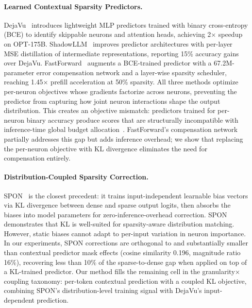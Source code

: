\paragraph{Learned Contextual Sparsity Predictors.}
DejaVu~\cite{liu2023dejavu} introduces lightweight MLP predictors trained with binary cross-entropy (BCE) to identify skippable neurons and attention heads, achieving 2$\times$ speedup on OPT-175B.
ShadowLLM~\cite{akhauri2024shadowllm} improves predictor architectures with per-layer MSE distillation of intermediate representations, reporting 15\% accuracy gains over DejaVu.
FastForward~\cite{gautam2026fastforward} augments a BCE-trained predictor with a 67.2M-parameter error compensation network and a layer-wise sparsity scheduler, reaching 1.45$\times$ prefill acceleration at 50\% sparsity.
All three methods optimize per-neuron objectives whose gradients factorize across neurons, preventing the predictor from capturing how joint neuron interactions shape the output distribution.
This creates an objective mismatch: predictors trained for per-neuron binary accuracy produce scores that are structurally incompatible with inference-time global budget allocation~\cite{liu2025teal}.
FastForward's compensation network partially addresses this gap but adds inference overhead; we show that replacing the per-neuron objective with KL divergence eliminates the need for compensation entirely.

\paragraph{Distribution-Coupled Sparsity Correction.}
SPON~\cite{xu2026spon} is the closest precedent: it trains input-independent learnable bias vectors via KL divergence between dense and sparse output logits, then absorbs the biases into model parameters for zero-inference-overhead correction.
SPON demonstrates that KL is well-suited for sparsity-aware distribution matching.
However, static biases cannot adapt to per-input variation in neuron importance.
In our experiments, SPON corrections are orthogonal to and substantially smaller than contextual predictor mask effects (cosine similarity 0.196, magnitude ratio 16\%), recovering less than 10\% of the sparse-to-dense gap when applied on top of a KL-trained predictor.
Our method fills the remaining cell in the granularity$\times$coupling taxonomy: per-token contextual prediction with a coupled KL objective, combining SPON's distribution-level training signal with DejaVu's input-dependent prediction.

